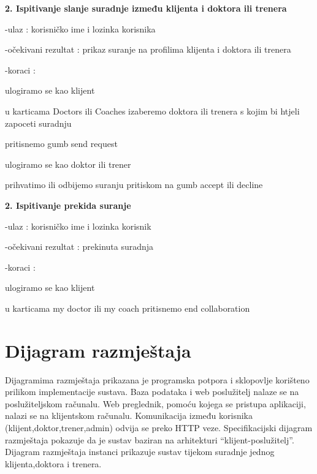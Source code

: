 			 
			 
			 \textbf{2. Ispitivanje slanje suradnje između klijenta i doktora ili trenera}
			 
			 -ulaz : korisničko ime i lozinka korisnika 
			 
			 -očekivani rezultat : prikaz suranje na profilima klijenta i doktora ili trenera
			 
			 -koraci : 
			 
			 \begin{packed_enum}
			 	
			 	\item ulogiramo se kao klijent    
			 	\item u karticama Doctors ili Coaches izaberemo doktora ili trenera s kojim bi htjeli zapoceti suradnju
			 	\item pritisnemo gumb send request
			 	\item  ulogiramo se kao doktor ili trener
			 	\item prihvatimo ili odbijemo suranju pritiskom na gumb accept ili decline
			 	
			 \end{packed_enum}
		 
		 	\textbf{2. Ispitivanje prekida suranje }
		 	
		 	-ulaz : korisničko ime i lozinka korisnik 
		 	
		 	-očekivani rezultat : prekinuta suradnja
		 	
		 	-koraci : 
		 	
		 	\begin{packed_enum}
		 		
		 		\item ulogiramo se kao klijent
		 		\item u karticama my doctor ili my coach pritisnemo end collaboration
		 		
		 		
		 	\end{packed_enum}
			
			\eject 
		
		
		\section{Dijagram razmještaja}
			
			Dijagramima razmještaja prikazana je programska potpora i sklopovlje korišteno prilikom implementacije sustava. Baza podataka i web poslužitelj nalaze se na poslužiteljskom računalu. Web preglednik, pomoću kojega se pristupa aplikaciji, nalazi se na klijentskom računalu. Komunikacija između korisnika (klijent,doktor,trener,admin) odvija se preko HTTP veze. Specifikacijski dijagram razmještaja pokazuje da je sustav baziran na arhitekturi “klijent-poslužitelj”. Dijagram razmještaja instanci prikazuje sustav tijekom suradnje jednog klijenta,doktora i trenera. 
			

